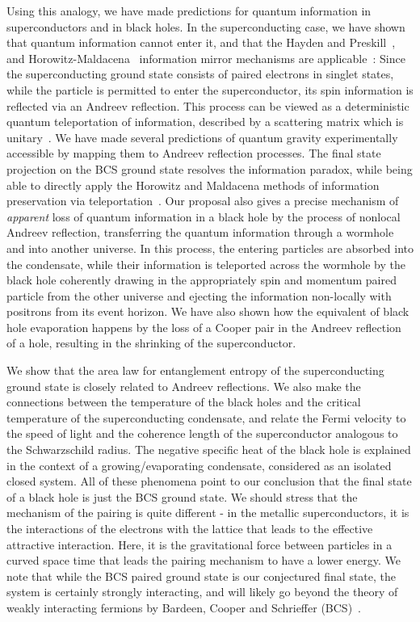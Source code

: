 \documentclass[10pt,letterpaper,aps,onecolumn,superscriptaddress,floatfix,notitlepage]{revtex4-1}
\begin{document}
	Using this analogy, we have made predictions for quantum information in superconductors and in black holes.  In the superconducting case, we have shown that quantum information cannot enter it, and that the Hayden and Preskill~\cite{preskill}, and Horowitz-Maldacena~\cite{horowitz} information mirror mechanisms are applicable~\cite{preskill,horowitz,projection}:   Since the superconducting ground state consists of paired electrons in singlet states, while the particle is permitted to enter the superconductor, its spin information is reflected via an Andreev reflection. This process can be viewed as a deterministic quantum  teleportation of information, described by a scattering matrix which is unitary~\cite{projection,horowitz}.  We have made several predictions of quantum gravity experimentally accessible by mapping them to Andreev reflection processes. The final state projection on the BCS ground state resolves the information paradox, while being able to directly apply the Horowitz and Maldacena methods of information preservation via teleportation~\cite{horowitz}.
	Our proposal also gives a precise mechanism of {\it apparent} loss of quantum information in a black hole by the process of nonlocal Andreev reflection, transferring the quantum information through a wormhole and into another universe.  In this process, the entering particles are absorbed into the condensate, while their information is teleported across the wormhole by the black hole coherently drawing in the appropriately spin and momentum paired particle from the other universe and ejecting the information non-locally with positrons from its event horizon.  We have also shown how the equivalent of black hole evaporation happens by the loss of a Cooper pair in the Andreev reflection of a hole, resulting in the shrinking of the superconductor. 
	
	We show that the area law for entanglement entropy of the superconducting ground state is closely related to Andreev reflections. We also make the connections between the temperature of the black holes and the critical temperature of the superconducting condensate, and relate the Fermi velocity to the speed of light and the coherence length of the superconductor analogous to the Schwarzschild radius. The negative specific heat of the black hole is explained in the context of a growing/evaporating condensate, considered as an isolated closed system. All of these phenomena point to our conclusion that the final state of a black hole is just the BCS ground state.  We should stress that the mechanism of the pairing is quite different - in the metallic superconductors, it is the interactions of the electrons with the lattice that leads to the effective attractive interaction.  Here, it is the gravitational force between particles in a curved space time that leads the pairing mechanism to have a lower energy. We note that while the BCS paired ground state is our conjectured final state, the system is certainly strongly interacting, and will likely go beyond the theory of weakly interacting fermions by Bardeen, Cooper and Schrieffer (BCS)~\cite{BCS}.
\end{document}
